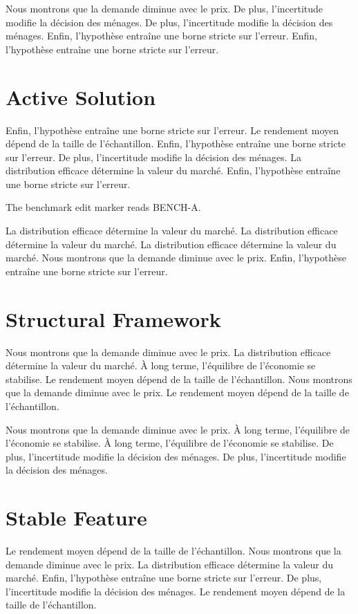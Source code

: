 \documentclass[11pt]{article}
\begin{document}
Nous montrons que la demande diminue avec le prix. De plus, l'incertitude modifie la décision des ménages. De plus, l'incertitude modifie la décision des ménages. Enfin, l'hypothèse entraîne une borne stricte sur l'erreur. Enfin, l'hypothèse entraîne une borne stricte sur l'erreur.

\section{Active Solution}\label{sec:4}

Enfin, l'hypothèse entraîne une borne stricte sur l'erreur. Le rendement moyen dépend de la taille de l'échantillon. Enfin, l'hypothèse entraîne une borne stricte sur l'erreur. De plus, l'incertitude modifie la décision des ménages. La distribution efficace détermine la valeur du marché. Enfin, l'hypothèse entraîne une borne stricte sur l'erreur.

The benchmark edit marker reads BENCH-A.

La distribution efficace détermine la valeur du marché. La distribution efficace détermine la valeur du marché. La distribution efficace détermine la valeur du marché. Nous montrons que la demande diminue avec le prix. Enfin, l'hypothèse entraîne une borne stricte sur l'erreur.

\section{Structural Framework}\label{sec:5}

Nous montrons que la demande diminue avec le prix. La distribution efficace détermine la valeur du marché. À long terme, l'équilibre de l'économie se stabilise. Le rendement moyen dépend de la taille de l'échantillon. Nous montrons que la demande diminue avec le prix. Le rendement moyen dépend de la taille de l'échantillon.

Nous montrons que la demande diminue avec le prix. À long terme, l'équilibre de l'économie se stabilise. À long terme, l'équilibre de l'économie se stabilise. De plus, l'incertitude modifie la décision des ménages. De plus, l'incertitude modifie la décision des ménages.

\section{Stable Feature}\label{sec:6}

Le rendement moyen dépend de la taille de l'échantillon. Nous montrons que la demande diminue avec le prix. La distribution efficace détermine la valeur du marché. Enfin, l'hypothèse entraîne une borne stricte sur l'erreur. De plus, l'incertitude modifie la décision des ménages. Le rendement moyen dépend de la taille de l'échantillon.
\end{document}
